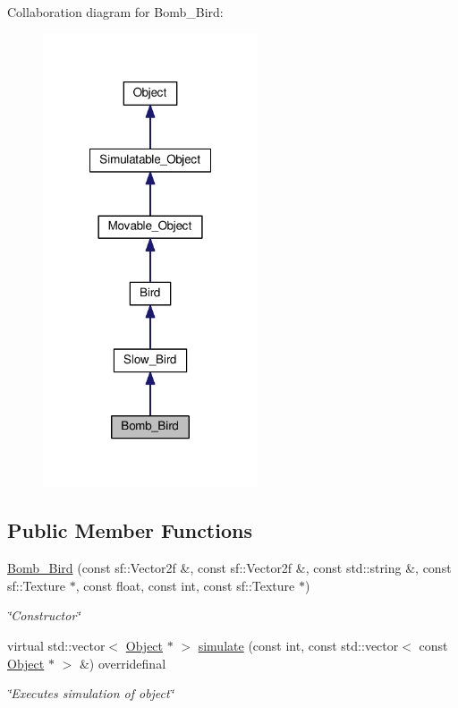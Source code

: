 Collaboration diagram for Bomb\+\_\+\+Bird\+:\nopagebreak
\begin{figure}[H]
\begin{center}
\leavevmode
\includegraphics[width=180pt]{classBomb__Bird__coll__graph}
\end{center}
\end{figure}
\subsection*{Public Member Functions}
\begin{DoxyCompactItemize}
\item 
\hyperlink{classBomb__Bird_a920e7058e7cff86be951c2b9feede80e}{Bomb\+\_\+\+Bird} (const sf\+::\+Vector2f \&, const sf\+::\+Vector2f \&, const std\+::string \&, const sf\+::\+Texture $\ast$, const float, const int, const sf\+::\+Texture $\ast$)
\begin{DoxyCompactList}\small\item\em \char`\"{}\+Constructor\char`\"{} \end{DoxyCompactList}\item 
virtual std\+::vector$<$ \hyperlink{classObject}{Object} $\ast$ $>$ \hyperlink{classBomb__Bird_a610b4c68c560a6ac30375c177642e021}{simulate} (const int, const std\+::vector$<$ const \hyperlink{classObject}{Object} $\ast$ $>$ \&) overridefinal
\begin{DoxyCompactList}\small\item\em \char`\"{}\+Executes simulation of object\char`\"{} \end{DoxyCompactList}\end{DoxyCompactItemize}
